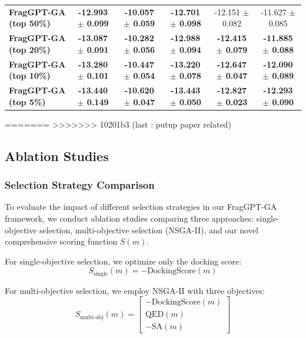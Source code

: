\documentclass[lettersize,journal]{IEEEtran}
\begin{document}
\begin{table}[t]
\begin{tabular}{l ccccc}
        \textbf{FragGPT-GA (top 50\%)} & \textbf{-12.993 $\pm$ 0.099} & \textbf{-10.057 $\pm$ 0.059} & \textbf{-12.701 $\pm$ 0.098} & -12.151 $\pm$ 0.082 & -11.627 $\pm$ 0.085\\
        \textbf{FragGPT-GA (top 20\%)} & \textbf{-13.087 $\pm$ 0.091} & \textbf{-10.282 $\pm$ 0.056} & \textbf{-12.988 $\pm$ 0.094} & \textbf{-12.415 $\pm$ 0.079} & \textbf{-11.885 $\pm$ 0.088} \\
        \textbf{FragGPT-GA (top 10\%)} & \textbf{-13.280 $\pm$ 0.101} & \textbf{-10.447 $\pm$ 0.054} & \textbf{-13.220 $\pm$ 0.078} & \textbf{-12.647 $\pm$ 0.047} & \textbf{-12.090 $\pm$ 0.089} \\
        \textbf{FragGPT-GA (top 5\%)} & \textbf{-13.440 $\pm$ 0.149} & \textbf{-10.620 $\pm$ 0.047} & \textbf{-13.443 $\pm$ 0.050} & \textbf{-12.827 $\pm$ 0.023} & \textbf{-12.293 $\pm$ 0.090} \\
        \hline
    \end{tabular}
\end{table}
=======
>>>>>>> 10201b3 (last : putup paper related)

\subsection{Ablation Studies}

\subsubsection{Selection Strategy Comparison}
To evaluate the impact of different selection strategies in our FragGPT-GA framework, we conduct ablation studies comparing three approaches: single-objective selection, multi-objective selection (NSGA-II), and our novel comprehensive scoring function $S(m)$. 

For single-objective selection, we optimize only the docking score:
\begin{equation}
S_{\text{single}}(m) = -\text{DockingScore}(m)
\end{equation}

For multi-objective selection, we employ NSGA-II with three objectives:
\begin{equation}
    S_{\text{multi-obj}}(m) = \begin{bmatrix} -\text{DockingScore}(m) \\ \text{QED}(m) \\ -\text{SA}(m) \end{bmatrix}
\end{equation}
\end{document}
